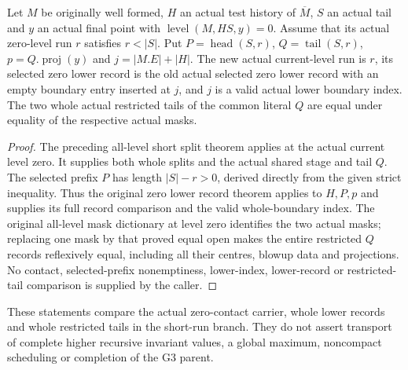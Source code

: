 \begin{theorem}
\label{hir:original-interior-selected-zero-short-lower-diagram}
\leanok
{}
Let $M$ be originally well formed, $H$ an actual test history of $\overline M$,
$S$ an actual tail and $y$ an actual final point with
$\operatorname{level}(M,HS,y)=0$.  Assume that its actual zero-level run
$r$ satisfies $r<|S|$.  Put $P=\operatorname{head}(S,r)$,
$Q=\operatorname{tail}(S,r)$, $p=Q.\operatorname{proj}(y)$ and
$j=|M.E|+|H|$.  The new actual current-level run is $r$, its selected
zero lower record is the old actual selected zero lower record with an
empty boundary entry inserted at $j$, and $j$ is a valid actual lower
boundary index.  The two whole actual restricted tails of the common
literal $Q$ are equal under equality of the respective actual masks.
\end{theorem}
\begin{proof}
The preceding all-level short split theorem applies at the actual current
level zero.  It supplies both whole splits and the actual shared stage and
tail $Q$.  The selected prefix $P$ has length $|S|-r>0$, derived directly
from the given strict inequality.  Thus the original zero lower record
theorem applies to $H,P,p$ and supplies its full record comparison and the
valid whole-boundary index.  The original all-level mask dictionary at
level zero identifies the two actual masks; replacing one mask by that
proved equal open makes the entire restricted $Q$ records reflexively
equal, including all their centres, blowup data and projections.
No contact, selected-prefix nonemptiness, lower-index, lower-record or
restricted-tail comparison is supplied by the caller.
\end{proof}

These statements compare the actual zero-contact carrier, whole lower
records and whole restricted tails in the short-run branch.  They do not
assert transport of complete higher recursive invariant values, a global
maximum, noncompact scheduling or completion of the G3 parent.
